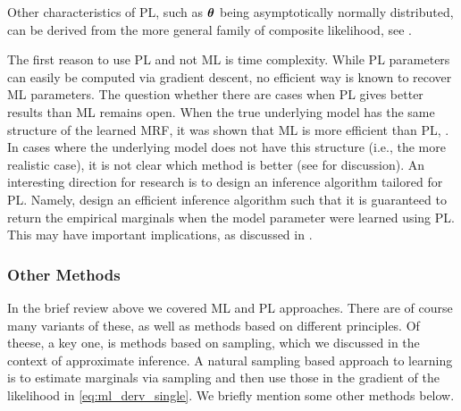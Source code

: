 Other characteristics of PL, such as $\boldsymbol{\theta}$ being asymptotically normally distributed, can be derived from the more general family of composite likelihood, see \cite{varin2011overview}.

The first reason to use PL and not ML is time complexity.
While PL parameters can easily be computed via gradient descent, no efficient way is known to recover ML parameters.
The question whether there are cases when PL gives better results than ML remains open.
When the true underlying model has the same structure of the learned MRF, it was shown that ML is more efficient than PL, \cite{liang2008asymptotic}.
In cases where the underlying model does not have this structure (i.e., the more realistic case), it is not clear which method is better (see \cite{varin2011overview} for discussion).
An interesting direction for research is to design an inference algorithm tailored for PL.
Namely, design an efficient inference algorithm such that it is guaranteed to return the empirical marginals when the model parameter were learned using PL.
This may have important implications, as discussed in .

\subsubsection{Other Methods}
In the brief review above we covered ML and PL approaches. There are of course 
many variants of these, as well as methods based on different principles. Of theese, a key one, is methods based on sampling, which we discussed in the context of approximate inference. A natural sampling based approach to learning is to estimate marginals via sampling and then use those in the gradient of the likelihood in \eqref{eq:ml_derv_single}. We briefly mention some other methods below.
 
